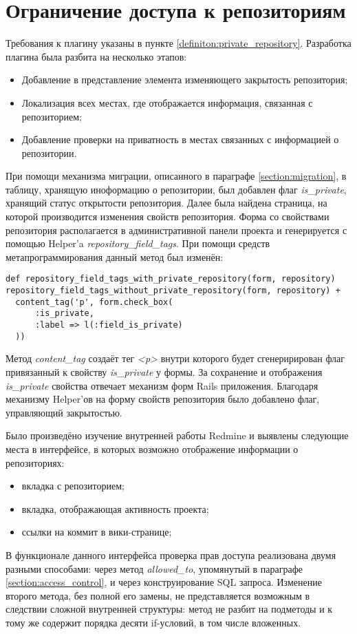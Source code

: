 \section{Ограничение доступа к репозиториям}
Требования к плагину указаны в пункте \ref{definiton:private_repository}.
Разработка плагина была разбита на несколько этапов:
\begin{itemize}
  \item Добавление в представление элемента изменяющего закрытость репозитория;
  \item Локализация всех местах, где отображается информация, связанная с
  репозиторием;
  \item Добавление проверки на приватность в местах связанных с
  информацией о репозитории.
\end{itemize}

При помощи механизма миграции, описанного в параграфе \ref{section:migration},
в таблицу, хранящую иноформацию о репозитории, был добавлен флаг \textit{is\_private},
хранящий статус открытости репозитория. Далее была найдена страница, на которой
производится изменения свойств репозитория. Форма со свойствами репозитория
располагается в административной панели проекта и генерируется с помощью
Helper'a \textit{repository\_field\_tags}. При помощи средств метапрограммирования
данный метод был изменён:
\small{\begin{lstlisting}
def repository_field_tags_with_private_repository(form, repository)
repository_field_tags_without_private_repository(form, repository) +
  content_tag('p', form.check_box(
      :is_private,
      :label => l(:field_is_private)
  ))
\end{lstlisting}}
Метод \textit{content\_tag} создаёт тег \textit{<p>} внутри которого будет
сгенеририрован флаг привязанный к свойству \textit{is\_private} у формы. За
сохранение и отображения \textit{is\_private} свойства отвечает механизм форм
Rails приложения.
Благодаря механизму Helper'ов на форму свойств репозитория было добавлено флаг,
управляющий закрытостью.

Было произведёно изучение внутренней работы Redmine и выявлены следующие места
в интерфейсе, в которых возможно отображение информации о репозиториях:
\begin{itemize}
  \item вкладка с репозиторием;
  \item вкладка, отображающая активность проекта;
  \item ссылки на коммит в вики-странице;
\end{itemize}
В функционале данного интерфейса проверка прав доступа реализована двумя
разными способами: через метод \textit{allowed\_to}, упомянутый в параграфе
\ref{section:access_control}, и через конструирование SQL запроса. Изменение
второго метода, без полной его замены, не представляется возможным в следствии
сложной внутренней структуры: метод не разбит на подметоды и к тому же содержит
порядка десяти if-условий, в том числе вложенных.

